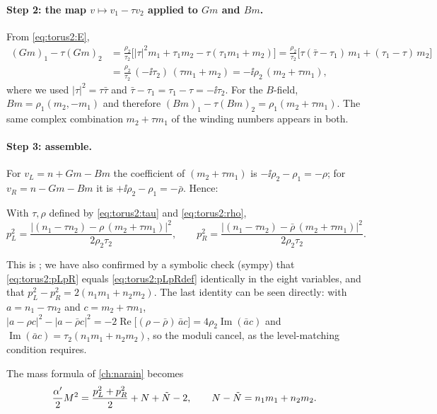\paragraph{Step 2: the map $v\mapsto v_1-\tau v_2$ applied to $Gm$ and $Bm$.} From
\eqref{eq:torus2:E},
\begin{align*}
 (Gm)_1-\tau(Gm)_2&=\frac{\rho_2}{\tau_2}\Big[|\tau|^2m_1+\tau_1m_2-\tau(\tau_1m_1+m_2)\Big]
 =\frac{\rho_2}{\tau_2}\Big[\tau(\bar\tau-\tau_1)\,m_1+(\tau_1-\tau)\,m_2\Big]\\
 &=\frac{\rho_2}{\tau_2}\,(-\ii\tau_2)\,(\tau m_1+m_2)=-\ii\rho_2\,(m_2+\tau m_1),
\end{align*}
where we used $|\tau|^2=\tau\bar\tau$ and $\bar\tau-\tau_1=\tau_1-\tau=-\ii\tau_2$. For the
$B$-field, $Bm=\rho_1(m_2,-m_1)$ and therefore $(Bm)_1-\tau(Bm)_2=\rho_1(m_2+\tau m_1)$. The
same complex combination $m_2+\tau m_1$ of the winding numbers appears in both.

\paragraph{Step 3: assemble.} For $v_L=n+Gm-Bm$ the coefficient of $(m_2+\tau m_1)$ is
$-\ii\rho_2-\rho_1=-\rho$; for $v_R=n-Gm-Bm$ it is $+\ii\rho_2-\rho_1=-\bar\rho$. Hence:

\begin{proposition}\label{thm:torus2:spectrum}
With $\tau,\rho$ defined by \eqref{eq:torus2:tau} and \eqref{eq:torus2:rho},
\begin{equation}\label{eq:torus2:pLpR}
 p_L^2=\frac{\big|(n_1-\tau n_2)-\rho\,(m_2+\tau m_1)\big|^2}{2\rho_2\tau_2},
 \qquad
 p_R^2=\frac{\big|(n_1-\tau n_2)-\bar\rho\,(m_2+\tau m_1)\big|^2}{2\rho_2\tau_2}.
\end{equation}
\end{proposition}

\noindent This is ; we have also confirmed
by a symbolic check (sympy) that \eqref{eq:torus2:pLpR} equals \eqref{eq:torus2:pLpRdef}
identically in the eight variables, and that $p_L^2-p_R^2=2(n_1m_1+n_2m_2)$. The last
identity can be seen directly: with $a=n_1-\tau n_2$ and $c=m_2+\tau m_1$,
$|a-\rho c|^2-|a-\bar\rho c|^2=-2\operatorname{Re}\big[(\rho-\bar\rho)\,\bar a c\big]
=4\rho_2\operatorname{Im}(\bar ac)$ and
$\operatorname{Im}(\bar ac)=\tau_2(n_1m_1+n_2m_2)$, so the moduli cancel, as the
level-matching condition requires.

The mass formula of \cref{ch:narain} becomes
\begin{equation}\label{eq:torus2:mass}
 \frac{\alpha'}2M^2=\frac{p_L^2+p_R^2}{2}+N+\tilde N-2,\qquad N-\tilde N=n_1m_1+n_2m_2 .
\end{equation}

